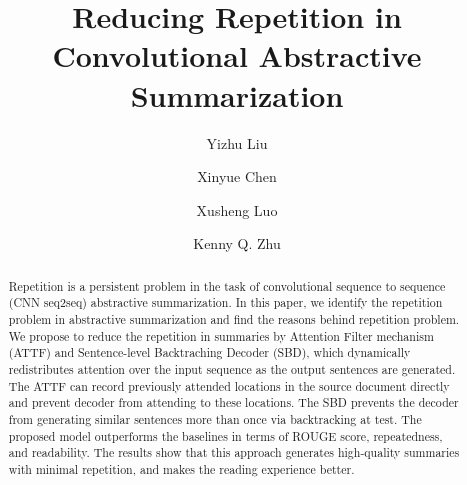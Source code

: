 \documentclass{nle}
\theoremstyle{definition}
\begin{document}
\label{firstpage}




\title{Reducing Repetition in Convolutional Abstractive Summarization}

\begin{authgrp}
\author{Yizhu Liu}
\author{Xinyue Chen}
\author{Xusheng Luo}
\author{ Kenny Q. Zhu}
\end{authgrp}


\begin{abstract}
Repetition is a persistent problem in the task of 
convolutional sequence to sequence (CNN seq2seq) abstractive summarization. 
In this paper, we identify the repetition problem in abstractive summarization and find the reasons behind repetition problem.
We propose to reduce the repetition in summaries by 
Attention Filter mechanism (ATTF) and Sentence-level Backtraching Decoder (SBD),
which dynamically redistributes attention over the input sequence 
as the output sentences are generated. 
The ATTF can record previously attended locations in the source document directly and prevent decoder from attending to these locations. The SBD prevents the decoder from generating similar sentences more than once via backtracking at test.
The proposed model outperforms the baselines 
in terms of ROUGE score, repeatedness, and readability. 
The results show that this approach 
generates high-quality summaries with minimal repetition,
and makes the reading experience better.
\end{abstract}

\maketitle








\label{lastpage}
\end{document}
